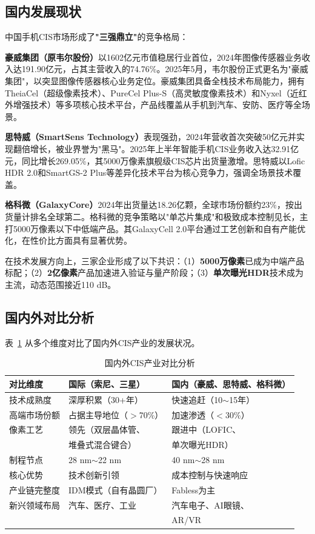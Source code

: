 \documentclass[12pt, a4paper]{ctexart}
\begin{document}
\subsection{国内发展现状}

中国手机CIS市场形成了\textbf{"三强鼎立"}的竞争格局\cite{qqCIS2025}：

\textbf{豪威集团（原韦尔股份）}以1602亿元市值稳居行业首位，2024年图像传感器业务收入达191.90亿元，占其主营收入的74.76\%。2025年5月，韦尔股份正式更名为"豪威集团"，以突显图像传感器核心业务定位\cite{sensorexpert2025}。豪威集团具备全栈技术布局能力，拥有TheiaCel（超级像素技术）、PureCel Plus-S（高灵敏度像素技术）和Nyxel（近红外增强技术）等多项核心技术平台，产品线覆盖从手机到汽车、安防、医疗等全场景\cite{laoyaoba2025}。

\textbf{思特威（SmartSens Technology）}表现强劲，2024年营收首次突破50亿元并实现翻倍增长，被业界誉为"黑马"。2025年上半年智能手机CIS业务收入达32.91亿元，同比增长269.05\%，其5000万像素旗舰级CIS芯片出货量激增\cite{qqCIS2025}。思特威以Lofic HDR 2.0和SmartGS-2 Plus等差异化技术平台为核心竞争力，强调全场景技术覆盖\cite{laoyaoba2025}。

\textbf{格科微（GalaxyCore）}2024年出货量达18.26亿颗，全球市场份额约23\%，按出货量计排名全球第二\cite{qqCIS2025}。格科微的竞争策略以"单芯片集成"和极致成本控制见长，主打5000万像素以下中低端产品。其GalaxyCell 2.0平台通过工艺创新和自有产能优化，在性价比方面具有显著优势\cite{laoyaoba2025}。

在技术发展方向上，三家企业形成了以下共识\cite{laoyaoba2025}：（1）\textbf{5000万像素}已成为中端产品标配；（2）\textbf{2亿像素}产品加速进入验证与量产阶段；（3）\textbf{单次曝光HDR}技术成为主流，动态范围接近110 dB。

\subsection{国内外对比分析}

表~\ref{tab:cn_vs_intl} 从多个维度对比了国内外CIS产业的发展状况。

\begin{table}[H]
\centering
\caption{国内外CIS产业对比分析}
\label{tab:cn_vs_intl}
\small
\begin{tabular}{lll}
\toprule
\textbf{对比维度} & \textbf{国际（索尼、三星）} & \textbf{国内（豪威、思特威、格科微）} \\
\midrule
技术成熟度 & 深厚积累（30+年） & 快速追赶（10$\sim$15年） \\
高端市场份额 & 占据主导地位（$>$70\%） & 加速渗透（$<$30\%） \\
像素工艺 & 领先（双层晶体管、 & 跟进中（LOFIC、 \\
 & 堆叠式混合键合） & 单次曝光HDR） \\
制程节点 & 28 nm$\sim$22 nm & 40 nm$\sim$28 nm \\
核心优势 & 技术创新引领 & 成本控制与快速响应 \\
产业链完整度 & IDM模式（自有晶圆厂） & Fabless为主 \\
新兴领域布局 & 汽车、医疗、工业 & 汽车电子、AI眼镜、 \\
 & & AR/VR \\
\bottomrule
\end{tabular}
\end{table}
\end{document}
